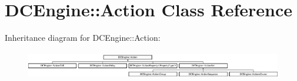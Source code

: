\hypertarget{classDCEngine_1_1Action}{\section{D\-C\-Engine\-:\-:Action Class Reference}
\label{classDCEngine_1_1Action}
}
Inheritance diagram for D\-C\-Engine\-:\-:Action\-:\begin{figure}[H]
\begin{center}
\leavevmode
\includegraphics[height=1.249071cm]{classDCEngine_1_1Action}
\end{center}
\end{figure}

